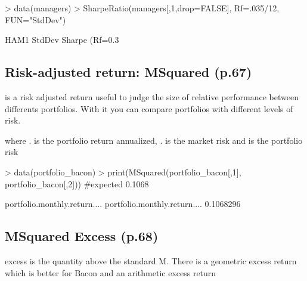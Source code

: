 \documentclass[12pt,letterpaper,english]{article}
\begin{document}

\begin{Schunk}
\begin{Sinput}
> data(managers)
> SharpeRatio(managers[,1,drop=FALSE], Rf=.035/12, FUN="StdDev") 
\end{Sinput}
\begin{Soutput}
                                     HAM1
StdDev Sharpe (Rf=0.3%
\end{Soutput}
\end{Schunk}

\subsection{Risk-adjusted return: MSquared (p.67)}

 is a risk adjusted return useful to judge the size of relative performance between differents portfolios. With it you can compare portfolios with different levels of risk.


where . is the portfolio return annualized, . is the market risk and  is the portfolio risk

\begin{Schunk}
\begin{Sinput}
> data(portfolio_bacon)
> print(MSquared(portfolio_bacon[,1], portfolio_bacon[,2])) #expected 0.1068
\end{Sinput}
\begin{Soutput}
                             portfolio.monthly.return....
portfolio.monthly.return....                    0.1068296
\end{Soutput}
\end{Schunk}

\subsection{MSquared Excess (p.68)}

 excess is the quantity above the standard M. There is a geometric excess return which is better for Bacon and an arithmetic excess return

\end{document}
